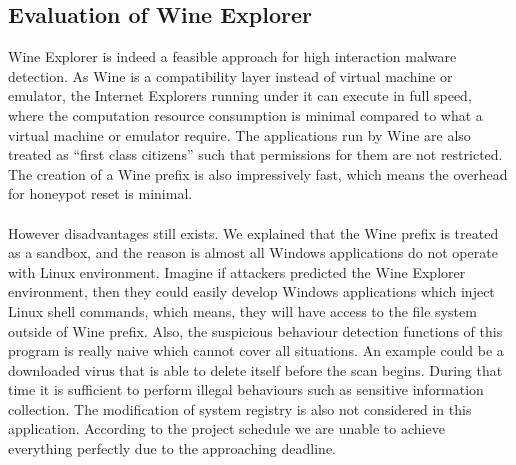 \subsection{Evaluation of Wine Explorer}
Wine Explorer is indeed a feasible approach for high interaction malware 
detection. As Wine is a compatibility layer instead of virtual machine or 
emulator, the Internet Explorers running under it can execute in full speed, 
where the computation resource consumption is minimal compared to what 
a virtual machine or emulator require. The applications run by Wine are also 
treated as ``first class citizens''\cite{wineperformance} such that 
permissions for them are not 
restricted. The creation of a Wine prefix is also impressively fast, which 
means the overhead for honeypot reset is minimal. 
\paragraph{}
However disadvantages still exists. We explained that the Wine prefix is treated
as a sandbox, and the reason is almost all Windows applications do not operate 
with Linux environment. Imagine if attackers predicted the Wine Explorer 
environment, then they could easily develop Windows applications which inject 
Linux shell commands, which means, they will have access to the file system 
outside of Wine prefix. Also, the suspicious behaviour detection functions of 
this program is really naive which cannot cover all situations. An example 
could 
be a downloaded virus that is able to delete itself before the scan begins. 
During that time it is sufficient to perform illegal behaviours such as 
sensitive information collection. The modification of system 
registry is also not considered in this application. According to the project 
schedule we are unable to achieve everything perfectly due to the approaching 
deadline. 
